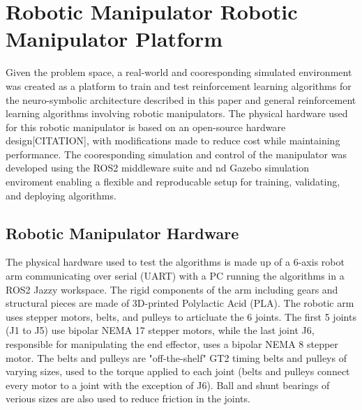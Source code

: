 \chapter{Robotic Manipulator Robotic Manipulator Platform}
Given the problem space, a real-world and cooresponding simulated environment was created as a platform to train and test reinforcement learning algorithms for the neuro-symbolic architecture described in this paper and general reinforcement learning algorithms involving robotic manipulators.
The physical hardware used for this robotic manipulator is based on an open-source hardware design[CITATION], with modifications made to reduce cost while maintaining performance.
The cooresponding simulation and control of the manipulator was developed using the ROS2 middleware suite and nd Gazebo simulation enviroment enabling a flexible and reproducable setup for training, validating, and deploying algorithms.

\section{Robotic Manipulator Hardware}  \label{se:robotic_manipulator_hardware}
The physical hardware used to test the algorithms is made up of a 6-axis robot arm communicating over serial (UART) with a PC running the algorithms in a ROS2 Jazzy workspace.
The rigid components of the arm including gears and structural pieces are made of 3D-printed Polylactic Acid (PLA).
The robotic arm uses stepper motors, belts, and pulleys to articluate the 6 joints. 
The first 5 joints (J1 to J5) use bipolar NEMA 17 stepper motors, while the last joint J6, responsible for manipulating the end effector, uses a bipolar NEMA 8 stepper motor.
The belts and pulleys are "off-the-shelf" GT2 timing belts and pulleys of varying sizes, used to the torque applied to each joint (belts and pulleys connect every motor to a joint with the exception of J6).
Ball and shunt bearings of verious sizes are also used to reduce friction in the joints.

